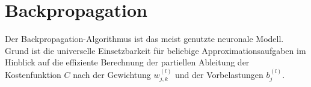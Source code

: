 \section{Backpropagation}
Der Backpropagation-Algorithmus ist das meist genutzte neuronale Modell. Grund ist die universelle Einsetzbarkeit für beliebige Approximationsaufgaben im Hinblick auf die effiziente Berechnung der partiellen Ableitung der Kostenfunktion $C$ nach der Gewichtung $w_{j,k}^{(l)}$ und der Vorbelastungen $b_j^{(l)}$. \\


